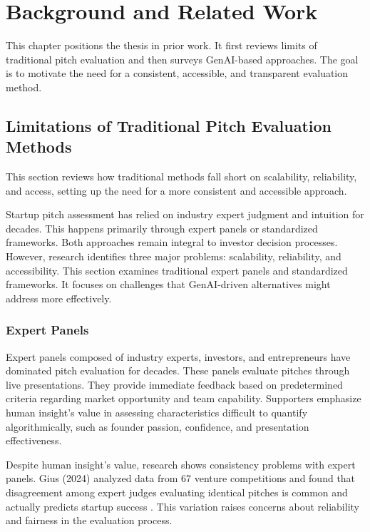 \chapter{Background and Related Work}
\label{ch:soa}

This chapter positions the thesis in prior work. It first reviews limits of traditional pitch evaluation and then surveys GenAI-based approaches. The goal is to motivate the need for a consistent, accessible, and transparent evaluation method.

\section{Limitations of Traditional Pitch Evaluation Methods}
\label{sec:traditional-methods}

This section reviews how traditional methods fall short on scalability, reliability, and access, setting up the need for a more consistent and accessible approach.

Startup pitch assessment has relied on industry expert judgment and intuition for decades. This happens primarily through expert panels or standardized frameworks. Both approaches remain integral to investor decision processes. However, research identifies three major problems: scalability, reliability, and accessibility. This section examines traditional expert panels and standardized frameworks. It focuses on challenges that GenAI-driven alternatives might address more effectively.

\subsection{Expert Panels}\label{subsec:expert-panels}
Expert panels composed of industry experts, investors, and entrepreneurs have dominated pitch evaluation for decades. These panels evaluate pitches through live presentations. They provide immediate feedback based on predetermined criteria regarding market opportunity and team capability. Supporters emphasize human insight's value in assessing characteristics difficult to quantify algorithmically, such as founder passion, confidence, and presentation effectiveness.

Despite human insight's value, research shows consistency problems with expert panels. Gius (2024) analyzed data from 67 venture competitions and found that disagreement among expert judges evaluating identical pitches is common and actually predicts startup success \cite{Gius2024}. This variation raises concerns about reliability and fairness in the evaluation process.

